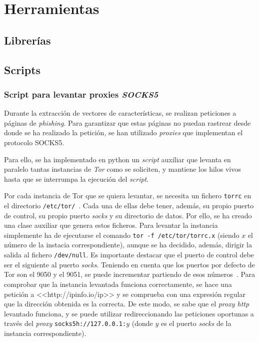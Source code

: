 
\section{Herramientas}

\subsection{Librerías}

\subsection{Scripts} 
\subsubsection{Script para levantar proxies \textit{SOCKS5}}

Durante la extracción de vectores de características, se realizan peticiones a páginas de \textit{phishing}. Para garantizar que estas páginas no puedan rastrear desde donde se ha realizado la petición, se han utilizado \textit{proxies} que implementan el protocolo SOCKS5.

Para ello, se ha implementado en python un \textit{script} auxiliar que levanta en paralelo tantas instancias de \textit{Tor} como se soliciten, y mantiene los hilos vivos hasta que se interrumpa la ejecución del \textit{script}.

Por cada instancia de Tor que se quiera levantar, se necesita un fichero \texttt{torrc} en el directorio \texttt{/etc/tor/}~\cite{TorFicherosTor}. Cada una de ellas debe tener, además, su propio puerto de control, su propio puerto \textit{socks} y su directorio de datos. Por ello, se ha creado una clase auxiliar que genera estos ficheros. Para levantar la instancia simplemente ha de ejecutarse el comando \texttt{tor -f /etc/tor/torrc.x} (siendo $x$ el número de la instacia correspondiente), aunque se ha decidido, además, dirigir la salida al fichero \texttt{/dev/null}. Es importante destacar que el puerto de control debe ser el siguiente al puerto \textit{socks}. Teniendo en cuenta que los puertos por defecto de Tor son el 9050 y el 9051, se puede incrementar partiendo de esos números~\cite{TorficheroComando}. Para comprobar que la instancia levantada funciona correctamente, se hace una petición a <<http://ipinfo.io/ip>> y se comprueba con una expresión regular que la dirección obtenida es la correcta. De este modo, se sabe que el \textit{proxy http} levantado funciona, y se puede utilizar redireccionando las peticiones oportunas a través del \textit{proxy} \texttt{socks5h://127.0.0.1:$y$} (donde $y$ es el puerto \textit{socks} de la instancia correspondiente). 

